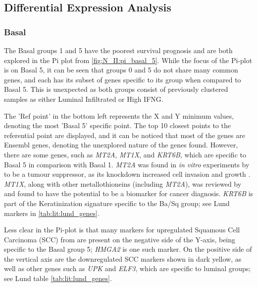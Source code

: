 \subsection{Differential Expression Analysis} \label{s:N_II:dea_rwd}

\subsubsection*{Basal} \label{s:N_II:basal}

The Basal groups 1 and 5 have the poorest survival prognosis and are both explored in the Pi plot from \cref{fig:N_II:pi_basal_5}. While the focus of the Pi-plot is on Basal 5, it can be seen that groups 0 and 5 do not share many common genes, and each has its subset of genes specific to its group when compared to Basal 5. This is unexpected as both groups consist of previously clustered samples as either Luminal Infiltrated or High IFNG.

The 'Ref point' in the bottom left represents the X and Y minimum values, denoting the most 'Basal 5' specific point. The top 10 closest points to the referential point are displayed, and it can be noticed that most of the genes are Ensembl genes, denoting the unexplored nature of the genes found. However, there are some genes, such as \textit{MT2A}, \textit{MT1X}, and \textit{KRT6B}, which are specific to Basal 5 in comparison with Basal 1. \textit{MT2A} was found in \textit{in vitro} experiments by to be a tumour suppressor, as its knockdown increased cell invasion and growth \citep{Sung2022-tm}. \textit{MT1X}, along with other metallothioneins (including \textit{MT2A}), was reviewed by \citep{Si2018-ep} and found to have the potential to be a biomarker for cancer diagnosis. \textit{KRT6B} is part of the Keratinization signature specific to the Ba/Sq group; see Lund markers in \cref{tab:lit:lund_genes}.

Less clear in the Pi-plot is that many markers for upregulated Squamous Cell Carcinoma (SCC) from \citep{Hurst2022-sp} are present on the negative side of the Y-axis, being specific to the Basal group 5; \textit{HMGA2} is one such marker. On the positive side of the vertical axis are the downregulated SCC markers shown in dark yellow, as well as other genes such as \textit{UPK} and \textit{ELF3}, which are specific to luminal groups; see Lund table \cref{tab:lit:lund_genes}.

